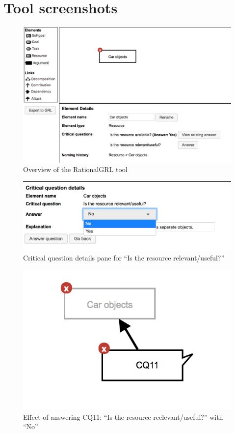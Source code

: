 \section{Tool screenshots}
\label{sect:tool-screenshots}

\begin{figure}[ht]
\centering
\includegraphics[scale=0.6]{img/tool-overview}
\caption{Overview of the RationalGRL tool}
\label{fig:tool:overview}
\end{figure}

\begin{figure}[ht]
\centering
\includegraphics[scale=0.6]{img/tool-cqdetails}
\caption{Critical question details pane for ``Is the resource relevant/useful?''}
\label{fig:tool:cqdetails}
\end{figure}

\newpage

\begin{figure}[ht]
\centering
\includegraphics[scale=0.6]{img/tool-cqeffect}
\caption{Effect of answering CQ11: ``Is the resource reelevant/useful?'' with ``No''}
\label{fig:tool:cqeffect}
\end{figure}

